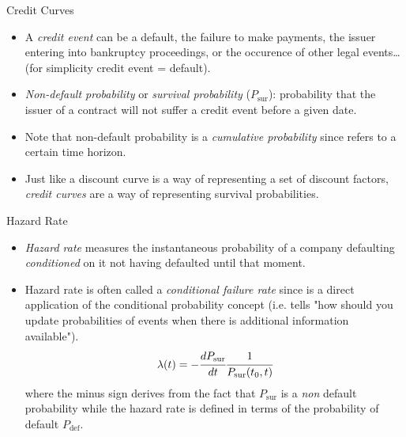 \documentclass{beamer}
\begin{document}
\begin{frame}{Credit Curves}
\begin{itemize}
    \item A \emph{credit event} can be a default, the failure to make payments, the issuer entering into bankruptcy proceedings, or the occurence of other legal events\dots (for simplicity credit event = default).
    \item \emph{Non-default probability} or \emph{survival probability} ($P_{\textrm{sur}}$): probability that the issuer of a contract will not suffer a credit event before a given date. 
    \item Note that non-default probability is a \emph{cumulative probability} since refers to a certain time horizon. 
    \item Just like a discount curve is a way of representing a set of discount factors, \emph{credit curves} are a way of representing survival probabilities.
\end{itemize}
\end{frame}

\begin{frame}{Hazard Rate}
	\begin{itemize}
		\item \emph{Hazard rate} measures the instantaneous probability of a company defaulting \emph{conditioned} on it not having defaulted until that moment.
		\item Hazard rate is often called a \emph{conditional failure rate} since is a direct application of the conditional probability concept (i.e. tells "how should you update probabilities of events when there is additional information available"). 
		\begin{equation*}
		\lambda(t) = -\cfrac{dP_{\textrm{sur}}}{dt}\cfrac{1}{P_{\textrm{sur}}(t_0, t)}
		\end{equation*}
		where the minus sign derives from the fact that $P_{\textrm{sur}}$ is a \emph{non} default probability while the hazard rate is defined in terms of the probability of default $P_{\textrm{def}}$.
	\end{itemize}
\end{frame}
\end{document}
